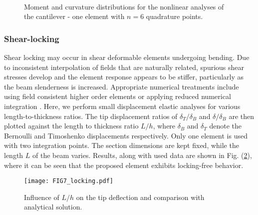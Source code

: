 \begin{figure}[b]
	\centering
	\hspace*{-0.47cm}\\
	\hspace*{-0.47cm}
	\caption{Moment and curvature distributions for the nonlinear 
		analyses of the cantilever - one element with $n=6$ quadrature points.}
	\label{fig:FIG6_MQN}
\end{figure}

\clearpage

\subsubsection{Shear-locking}
Shear locking may occur in shear deformable elements undergoing bending.
Due to inconsistent interpolation of fields that are naturally related, spurious
shear stresses develop and the element response appears to be stiffer,
particularly as the beam slenderness is increased. Appropriate numerical
treatments include using field consistent higher order elements or applying
reduced numerical integration \cite{Reddy,Prathap,ZienShear}. Here, we perform
small displacement elastic analyses for various length-to-thickness
ratios. The tip displacement ratios of $\delta_T/\delta_B$ and $\delta/\delta_B$
are then plotted against the length to thickness ratio $L/h$, where $\delta_B$
and $\delta_T$ denote the Bernoulli and Timoshenko displacements respectively.
Only one element is used with two integration points. The section dimensions
are kept fixed, while the length $L$ of the beam varies. Results, along
with used data are shown in Fig. (\ref{fig:FIG7_lock}), where it can be seen 
that the
proposed element exhibits locking-free behavior.

\begin{figure}[t]
	\centering
	\texttt{[image: FIG7\_locking.pdf]}
	\caption{Influence of $L/h$ on the tip deflection and comparison with
		analytical solution.}
	\label{fig:FIG7_lock}
\end{figure}


